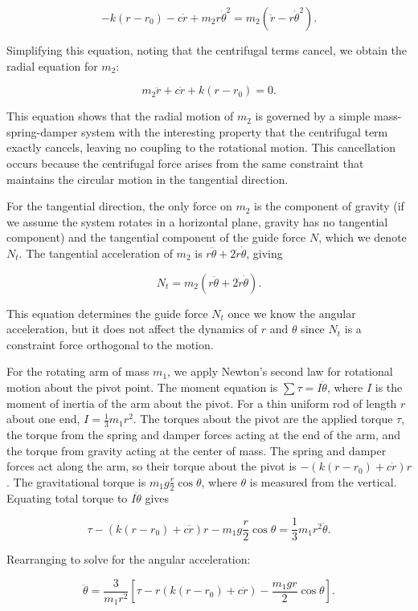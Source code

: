 \begin{example}
\[
-k(r - r_0) - c\dot{r} + m_2r\dot{\theta}^2 = m_2(\ddot{r} - r\dot{\theta}^2).
\]

Simplifying this equation, noting that the centrifugal terms cancel, we obtain the radial equation for $m_2$:

\[
m_2\ddot{r} + c\dot{r} + k(r - r_0) = 0.
\]

This equation shows that the radial motion of $m_2$ is governed by a simple mass-spring-damper system with the interesting property that the centrifugal term exactly cancels, leaving no coupling to the rotational motion. This cancellation occurs because the centrifugal force arises from the same constraint that maintains the circular motion in the tangential direction.

For the tangential direction, the only force on $m_2$ is the component of gravity (if we assume the system rotates in a horizontal plane, gravity has no tangential component) and the tangential component of the guide force $N$, which we denote $N_t$. The tangential acceleration of $m_2$ is $r\ddot{\theta} + 2\dot{r}\dot{\theta}$, giving

\[
N_t = m_2(r\ddot{\theta} + 2\dot{r}\dot{\theta}).
\]

This equation determines the guide force $N_t$ once we know the angular acceleration, but it does not affect the dynamics of $r$ and $\theta$ since $N_t$ is a constraint force orthogonal to the motion.

For the rotating arm of mass $m_1$, we apply Newton's second law for rotational motion about the pivot point. The moment equation is $\sum \tau = I\ddot{\theta}$, where $I$ is the moment of inertia of the arm about the pivot. For a thin uniform rod of length $r$ about one end, $I = \frac{1}{3}m_1r^2$. The torques about the pivot are the applied torque $\tau$, the torque from the spring and damper forces acting at the end of the arm, and the torque from gravity acting at the center of mass. The spring and damper forces act along the arm, so their torque about the pivot is $-(k(r - r_0) + c\dot{r})r$. The gravitational torque is $m_1g\frac{r}{2}\cos\theta$, where $\theta$ is measured from the vertical. Equating total torque to $I\ddot{\theta}$ gives

\[
\tau - (k(r - r_0) + c\dot{r})r - m_1g\frac{r}{2}\cos\theta = \frac{1}{3}m_1r^2\ddot{\theta}.
\]

Rearranging to solve for the angular acceleration:

\[
\ddot{\theta} = \frac{3}{m_1r^2}\left[\tau - r(k(r - r_0) + c\dot{r}) - \frac{m_1gr}{2}\cos\theta\right].
\]


\end{example}
